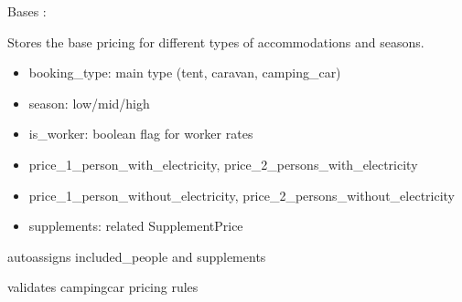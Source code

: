 \documentclass[letterpaper,10pt,french]{sphinxmanual}
\begin{document}
\begin{fulllineitems}
\label{\detokenize{index:bookings.models.Price}}
\pysigstartsignatures
\pysiglinewithargsret
{}
{\sphinxparamcomma {}}
{}
\pysigstopsignatures
\sphinxAtStartPar
Bases : 

\sphinxAtStartPar
Stores the base pricing for different types of accommodations and seasons.
\begin{description}
\begin{itemize}
\item {} 
\sphinxAtStartPar
booking\_type: main type (tent, caravan, camping\_car)

\item {} 
\sphinxAtStartPar
season: low/mid/high

\item {} 
\sphinxAtStartPar
is\_worker: boolean flag for worker rates

\item {} 
\sphinxAtStartPar
price\_1\_person\_with\_electricity, price\_2\_persons\_with\_electricity

\item {} 
\sphinxAtStartPar
price\_1\_person\_without\_electricity, price\_2\_persons\_without\_electricity

\item {} 
\sphinxAtStartPar
supplements: related SupplementPrice

\end{itemize}

\end{description}


\begin{fulllineitems}

\pysigstartsignatures
\pysigline
{}
\pysigstopsignatures
\sphinxAtStartPar
auto\sphinxhyphen{}assigns included\_people and supplements

\end{fulllineitems}



\begin{fulllineitems}

\pysigstartsignatures
\pysigline
{}
\pysigstopsignatures
\sphinxAtStartPar
validates camping\sphinxhyphen{}car pricing rules


\end{fulllineitems}
\end{fulllineitems}
\end{document}
